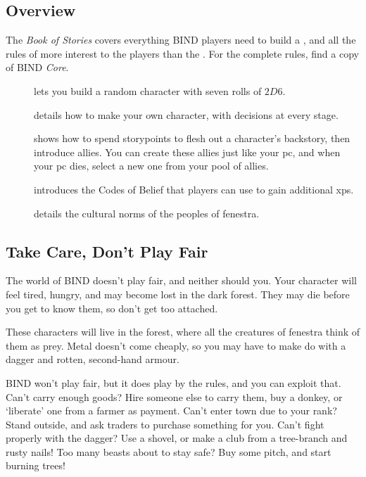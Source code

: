 \begin{multicols}{2}

\subsection*{Overview}

The \textit{Book of Stories} covers everything BIND players need to build a , and all the rules of more interest to the players than the .
For the complete rules, find a copy of BIND \textit{Core}.

\begin{description}
  \item[]
  lets you build a random character with seven rolls of $2D6$.
  \item[]
  details how to make your own character, with decisions at every stage.
  \item[] shows how to spend \glspl{storypoint} to flesh out a character's backstory, then introduce allies.
  You can create these allies just like your \gls{pc}, and when your \gls{pc} dies, select a new one from your pool of allies.
  \item[] introduces the Codes of Belief that players can use to gain additional \glspl{xp}.
  \item[] details the cultural norms of the peoples of \gls{fenestra}.
\end{description}


\subsection*{Take Care, Don't Play Fair}

The world of BIND doesn't play fair, and neither should you.
Your character will feel tired, hungry, and may become lost in the dark forest.
They may die before you get to know them, so don't get too attached.

These characters will live in the forest, where all the creatures of \gls{fenestra} think of them as prey.
Metal doesn't come cheaply, so you may have to make do with a dagger and rotten, second-hand armour.

BIND won't play fair, but it does play by the rules, and you can exploit that.
Can't carry enough goods?
Hire someone else to carry them, buy a donkey, or `liberate' one from a farmer as payment.
Can't enter town due to your rank?
Stand outside, and ask traders to purchase something for you.
Can't fight properly with the dagger?
Use a shovel, or make a club from a tree-branch and rusty nails!
Too many beasts about to stay safe?
Buy some pitch, and start burning trees!



\end{multicols}

